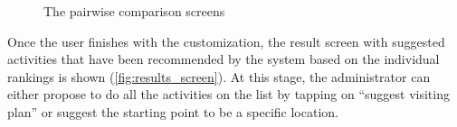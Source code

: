 \documentclass[11pt,a4paper,oneside]{article}
\begin{document}
\begin{figure}[H]
    \centering
    \qquad
    \qquad
    \caption{The pairwise comparison screens }%
    \label{fig:info_screens}%
\end{figure}

Once the user finishes with the customization, the result screen with suggested activities that have been recommended by the system based on the individual rankings is shown (\autoref{fig:results_screen}). At this stage, the administrator can either propose to do all the activities on the list by tapping on “suggest visiting plan” or suggest the starting point to be a specific location. 
\end{document}
